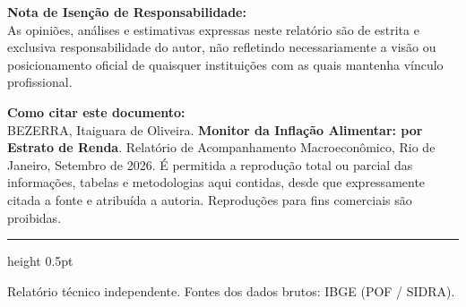 \documentclass[10pt,a4paper]{article}
\begin{document}
	\vspace{0.10cm}
	
	\begin{tcolorbox}[notabox]
		{\bfseries \color{bisnavy} Nota de Isenção de Responsabilidade:}\\[2pt]
		{\footnotesize \color{secondary} As opiniões, análises e estimativas expressas neste relatório são de estrita e exclusiva responsabilidade do autor, não refletindo necessariamente a visão ou posicionamento oficial de quaisquer instituições com as quais mantenha vínculo profissional.}
	\end{tcolorbox}
	
	\vspace{0.08cm}
	
	\begin{tcolorbox}[notabox]
		{\bfseries \color{bisnavy} Como citar este documento:}\\[2pt]
		{\footnotesize \color{secondary} BEZERRA, Itaiguara de Oliveira. \textbf{Monitor da Inflação Alimentar: por Estrato de Renda}. Relatório de Acompanhamento Macroeconômico, Rio de Janeiro, Setembro de 2026. É permitida a reprodução total ou parcial das informações, tabelas e metodologias aqui contidas, desde que expressamente citada a fonte e atribuída a autoria. Reproduções para fins comerciais são proibidas.}
	\end{tcolorbox}
	
	\vspace{0.10cm}
	{\color{rulecolor}\hrule height 0.5pt}
	\vspace{2pt}
	{\tiny \color{secondary} Relatório técnico independente. Fontes dos dados brutos: IBGE (POF / SIDRA).}
	
\end{document}
